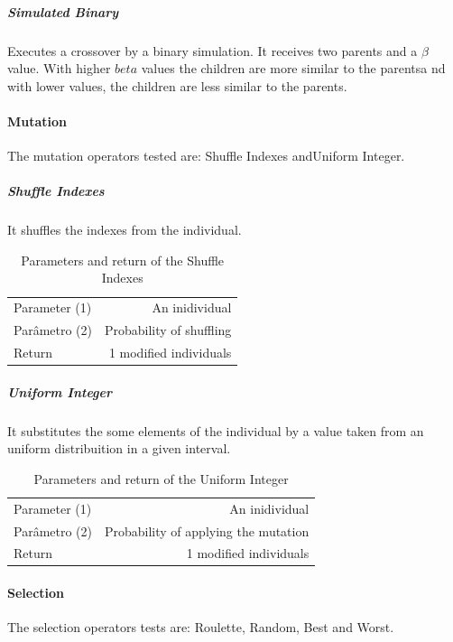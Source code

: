 \subparagraph{Simulated Binary}
Executes a crossover by a binary simulation. It receives two parents and a $\beta$ value. With  higher $beta$ values the children are more similar to the parentsa nd with lower values, the children are less similar to the parents.\\


\paragraph{Mutation}
The mutation operators tested are: Shuffle Indexes andUniform Integer.\\
\subparagraph{Shuffle Indexes}
It shuffles the indexes from the individual.\\

\begin{table}[!h]
  \begin{center}
  \begin{tabular}{|l|r|}
    \hline
    Parameter (1) & An inidividual\\
    Parâmetro (2) & Probability of shuffling\\
    Return & 1 modified individuals\\
    \hline    
  \end{tabular}
  \end{center}
  \caption{Parameters and return of the Shuffle Indexes}
  \label{Shuffle Indexes}
\end{table}

\subparagraph{Uniform Integer}
It substitutes the some elements of the individual by a value taken from an uniform distribuition in a given interval.\\


\begin{table}[!h]
  \begin{center}
  \begin{tabular}{|l|r|}
    \hline
    Parameter (1) & An inidividual\\
    Parâmetro (2) & Probability of applying the mutation\\
    Return & 1 modified individuals\\
    \hline    
  \end{tabular}
  \end{center}
  \caption{Parameters and return of the Uniform Integer}
  \label{Uniform Integer}
\end{table}

\paragraph{Selection}
The selection operators tests are: Roulette, Random, Best and Worst.\\

